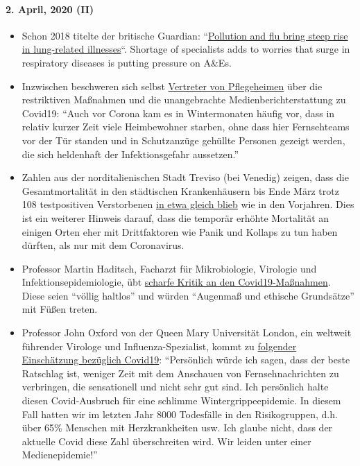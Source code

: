 \hypertarget{2-april-2020-ii}{%
\paragraph{2. April, 2020 (II)}\label{2-april-2020-ii}}

\begin{itemize}
\tightlist
\item
  Schon 2018 titelte der britische Guardian:
  ``\href{https://www.theguardian.com/society/2018/dec/09/steep-rise-lung-related-illness-hospitals-nhs}{Pollution
  and flu bring steep rise in lung-related illnesses}``. Shortage of
  specialists adds to worries that surge in respiratory diseases is
  putting pressure on A\&Es.
\item
  Inzwischen beschweren sich selbst
  \href{https://pflege-prisma.de/2020/03/31/sterbezahlen-in-pflegeheimen/}{Vertreter
  von Pflegeheimen} über die restriktiven Maßnahmen und die
  unangebrachte Medien­bericht­erstattung zu Covid19: ``Auch vor Corona
  kam es in Wintermonaten häufig vor, dass in relativ kurzer Zeit viele
  Heimbewohner starben, ohne dass hier Fernsehteams vor der Tür standen
  und in Schutzanzüge gehüllte Personen gezeigt werden, die sich
  heldenhaft der Infektionsgefahr aussetzen.''
\item
  Zahlen aus der norditalienischen Stadt Treviso (bei Venedig) zeigen,
  dass die Gesamtmortalität in den städtischen Krankenhäusern bis Ende
  März trotz 108 testpositiven Verstorbenen
  \href{https://swprs.files.wordpress.com/2020/04/reppublica-treviso.jpg}{in
  etwa gleich blieb} wie in den Vorjahren. Dies ist ein weiterer Hinweis
  darauf, dass die temporär erhöhte Mortalität an einigen Orten eher mit
  Drittfaktoren wie Panik und Kollaps zu tun haben dürften, als nur mit
  dem Coronavirus.
\item
  Professor Martin Haditsch, Facharzt für Mikrobiologie, Virologie und
  Infektions­epidemiologie, übt
  \href{https://www.youtube.com/watch?v=PtzHH8DhgZM}{scharfe Kritik an
  den Covid19-Maßnahmen}. Diese seien ``völlig haltlos'' und würden
  ``Augenmaß und ethische Grundsätze'' mit Füßen treten.
\item
  Professor John Oxford von der Queen Mary Universität London, ein
  weltweit führender Virologe und Influenza-Spezialist, kommt zu
  \href{https://novuscomms.com/2020/03/31/a-view-from-the-hvivo-open-orphan-orph-laboratory-professor-john-oxford/}{folgender
  Einschätzung bezüglich Covid19}: ``Persönlich würde ich sagen, dass
  der beste Ratschlag ist, weniger Zeit mit dem Anschauen von
  Fernsehnachrichten zu verbringen, die sensationell und nicht sehr gut
  sind. Ich persönlich halte diesen Covid-Ausbruch für eine schlimme
  Winter­grippe­epidemie. In diesem Fall hatten wir im letzten Jahr 8000
  Todesfälle in den Risikogruppen, d.h. über 65\% Menschen mit
  Herzkrankheiten usw. Ich glaube nicht, dass der aktuelle Covid diese
  Zahl überschreiten wird. Wir leiden unter einer Medienepidemie!''
\end{itemize}

